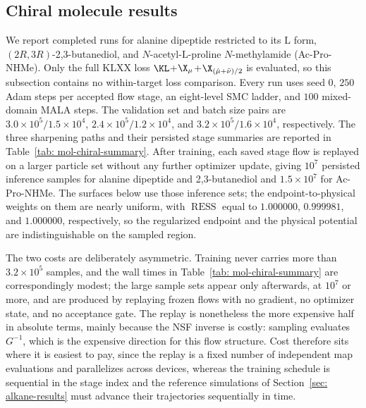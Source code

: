 \documentclass{article}
\begin{document}
\subsection{Chiral molecule results}
\label{sec: mol-chiral-results}

We report completed runs for alanine dipeptide restricted to its \(\mathrm L\) form, \((2R,3R)\)-2,3-butanediol, and \(N\)-acetyl-\(\mathrm L\)-proline \(N\)-methylamide (Ac-Pro-NHMe). Only the full KLXX loss $\KL$+$\X_\mu$+$\X_{(\hat\mu+\bar\nu)/2}$ is evaluated, so this subsection contains no within-target loss comparison. Every run uses seed \(0\), \(250\) Adam steps per accepted flow stage, an eight-level SMC ladder, and \(100\) mixed-domain MALA steps. The validation set and batch size pairs are \(3.0\times10^5/1.5\times10^4\), \(2.4\times10^5/1.2\times10^4\), and \(3.2\times10^5/1.6\times10^4\), respectively. The three sharpening paths and their persisted stage summaries are reported in Table~\ref{tab: mol-chiral-summary}. After training, each saved stage flow is replayed on a larger particle set without any further optimizer update, giving \(10^7\) persisted inference samples for alanine dipeptide and 2,3-butanediol and \(1.5\times10^7\) for Ac-Pro-NHMe. The surfaces below use those inference sets; the endpoint-to-physical weights on them are nearly uniform, with \(\operatorname{RESS}\) equal to \(1.000000\), \(0.999981\), and \(1.000000\), respectively, so the regularized endpoint and the physical potential are indistinguishable on the sampled region.

The two costs are deliberately asymmetric. Training never carries more than \(3.2\times10^5\) samples, and the wall times in Table~\ref{tab: mol-chiral-summary} are correspondingly modest; the large sample sets appear only afterwards, at \(10^7\) or more, and are produced by replaying frozen flows with no gradient, no optimizer state, and no acceptance gate. The replay is nonetheless the more expensive half in absolute terms, mainly because the NSF inverse is costly: sampling evaluates \(G^{-1}\), which is the expensive direction for this flow structure. Cost therefore sits where it is easiest to pay, since the replay is a fixed number of independent map evaluations and parallelizes across devices, whereas the training schedule is sequential in the stage index and the reference simulations of Section~\ref{sec: alkane-results} must advance their trajectories sequentially in time.
\end{document}
